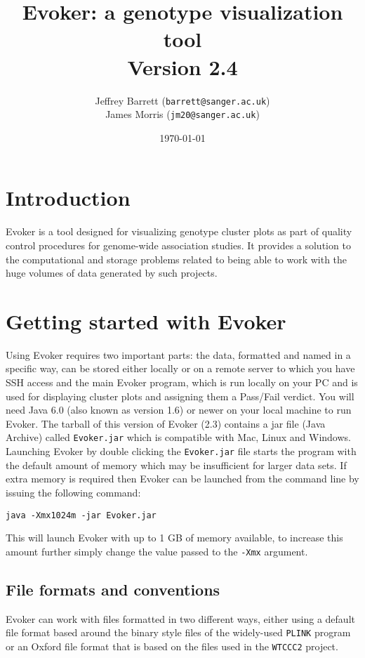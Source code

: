 \documentclass{article}
\title{Evoker: a genotype visualization tool \\ Version 2.4}
\author{Jeffrey Barrett (\texttt{barrett@sanger.ac.uk})\\
James Morris (\texttt{jm20@sanger.ac.uk})}
\date{\today}
\begin{document}
\maketitle
\tableofcontents

\section{Introduction}
Evoker is a tool designed for visualizing genotype cluster plots as part of quality control procedures for genome-wide association studies. It provides a solution to the computational and storage problems related to being able to work with the huge volumes of data generated by such projects.

\section{Getting started with Evoker}

Using Evoker requires two important parts: the data, formatted and named in a specific way, can be stored either locally or on a remote server to which you have SSH access and the main Evoker program, which is run locally on your PC and is used for displaying cluster plots and assigning them a Pass/Fail verdict. You will need Java 6.0 (also known as version 1.6) or newer on your local machine to run Evoker. The tarball of this version of Evoker (2.3) contains a jar file (Java Archive) called \texttt{Evoker.jar} which is compatible with Mac, Linux and Windows. Launching Evoker by double clicking the \texttt{Evoker.jar} file starts the program with the default amount of memory which may be insufficient for larger data sets. If extra memory is required then Evoker can be launched from the command line by issuing the following command:
\begin{verbatim}
java -Xmx1024m -jar Evoker.jar 
\end{verbatim}
This will launch Evoker with up to 1 GB of memory available, to increase this amount further simply change the value passed to the \texttt{-Xmx} argument.

\subsection{File formats and conventions}

Evoker can work with files formatted in two different ways, either using a default file format based around the binary style files of the widely-used \texttt{PLINK} program or an Oxford file format that is based on the files used in the \texttt{WTCCC2} project. 
\end{document}
